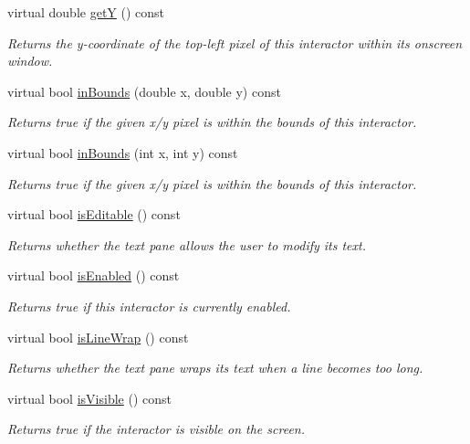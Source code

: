 \begin{DoxyCompactItemize}
virtual double \mbox{\hyperlink{classGInteractor_aafa51c7f8f38a09febbb9ce7853f77b4}{getY}} () const
\begin{DoxyCompactList}\small\item\em Returns the y-\/coordinate of the top-\/left pixel of this interactor within its onscreen window. \end{DoxyCompactList}\item 
virtual bool \mbox{\hyperlink{classGInteractor_afc480f652b8c5f1fb255e2269ce68879}{in\+Bounds}} (double x, double y) const
\begin{DoxyCompactList}\small\item\em Returns true if the given x/y pixel is within the bounds of this interactor. \end{DoxyCompactList}\item 
virtual bool \mbox{\hyperlink{classGInteractor_ae6d7982c1c627b677a5e776ca86118ed}{in\+Bounds}} (int x, int y) const
\begin{DoxyCompactList}\small\item\em Returns true if the given x/y pixel is within the bounds of this interactor. \end{DoxyCompactList}\item 
virtual bool \mbox{\hyperlink{classGBrowserPane_a012b5afb54e037e6c5498cf0932a521b}{is\+Editable}} () const
\begin{DoxyCompactList}\small\item\em Returns whether the text pane allows the user to modify its text. \end{DoxyCompactList}\item 
virtual bool \mbox{\hyperlink{classGInteractor_aacb819fb241851fd9fc045271baa4034}{is\+Enabled}} () const
\begin{DoxyCompactList}\small\item\em Returns true if this interactor is currently enabled. \end{DoxyCompactList}\item 
virtual bool \mbox{\hyperlink{classGBrowserPane_ae09e72290b6e8a23bcc77752da6dffa5}{is\+Line\+Wrap}} () const
\begin{DoxyCompactList}\small\item\em Returns whether the text pane wraps its text when a line becomes too long. \end{DoxyCompactList}\item 
virtual bool \mbox{\hyperlink{classGInteractor_a9d8a6cfb13917785c143e74d40e4e2be}{is\+Visible}} () const
\begin{DoxyCompactList}\small\item\em Returns true if the interactor is visible on the screen. \end{DoxyCompactList}\item 

\end{DoxyCompactItemize}
